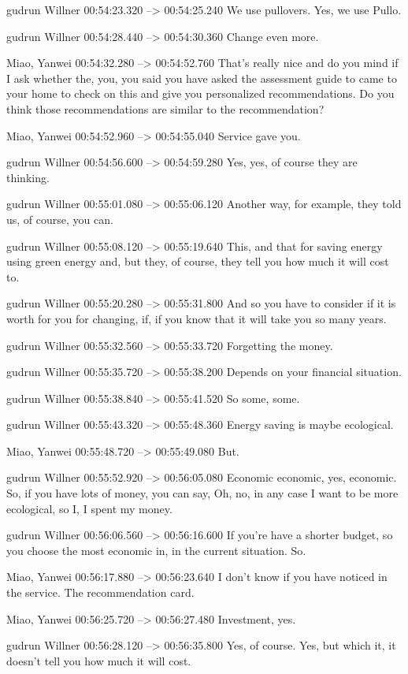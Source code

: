 {gudrun Willner 00:54:23.320 --> 00:54:25.240
We use pullovers. Yes, we use Pullo.

gudrun Willner 00:54:28.440 --> 00:54:30.360
Change even more.

Miao, Yanwei 00:54:32.280 --> 00:54:52.760
That's really nice and do you mind if I ask whether the, you, you said you have asked the assessment guide to came to your home to check on this and give you personalized recommendations. Do you think those recommendations are similar to the recommendation?

Miao, Yanwei 00:54:52.960 --> 00:54:55.040
Service gave you.

gudrun Willner 00:54:56.600 --> 00:54:59.280
Yes, yes, of course they are thinking.

gudrun Willner 00:55:01.080 --> 00:55:06.120
Another way, for example, they told us, of course, you can.

gudrun Willner 00:55:08.120 --> 00:55:19.640
This, and that for saving energy using green energy and, but they, of course, they tell you how much it will cost to.

gudrun Willner 00:55:20.280 --> 00:55:31.800
And so you have to consider if it is worth for you for changing, if, if you know that it will take you so many years.

gudrun Willner 00:55:32.560 --> 00:55:33.720
Forgetting the money.

gudrun Willner 00:55:35.720 --> 00:55:38.200
Depends on your financial situation.

gudrun Willner 00:55:38.840 --> 00:55:41.520
So some, some.

gudrun Willner 00:55:43.320 --> 00:55:48.360
Energy saving is maybe ecological.

Miao, Yanwei 00:55:48.720 --> 00:55:49.080
But.

gudrun Willner 00:55:52.920 --> 00:56:05.080
Economic economic, yes, economic. So, if you have lots of money, you can say, Oh, no, in any case I want to be more ecological, so I, I spent my money.

gudrun Willner 00:56:06.560 --> 00:56:16.600
If you're have a shorter budget, so you choose the most economic in, in the current situation. So.

Miao, Yanwei 00:56:17.880 --> 00:56:23.640
I don't know if you have noticed in the service. The recommendation card.

Miao, Yanwei 00:56:25.720 --> 00:56:27.480
Investment, yes.

gudrun Willner 00:56:28.120 --> 00:56:35.800
Yes, of course. Yes, but which it, it doesn't tell you how much it will cost.

}

